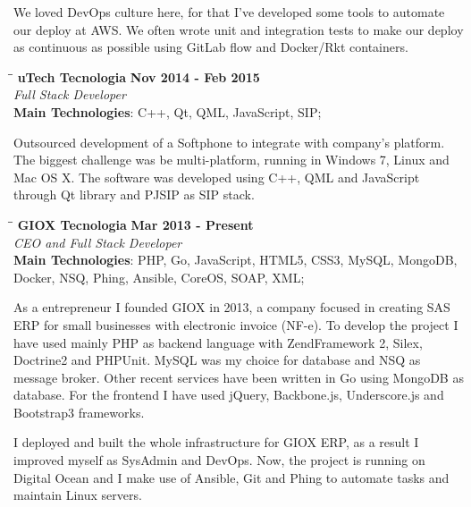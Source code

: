 \documentclass[margin]{res}
\begin{document}
\begin{resume}
We loved DevOps culture here, for that I've developed some tools to automate our deploy at AWS. We often wrote unit and integration tests to make our deploy as continuous as possible using GitLab flow and Docker/Rkt containers.

\newpage

\vspace{-0.1in}
    \begin{tabbing}
    \hspace{2.3in}\= \hspace{1.7in}\= \kill
    \textbf{uTech Tecnologia}    \>\>\textbf{Nov 2014 - Feb 2015}\\
    \textit{Full Stack Developer}\\
    \textbf{Main Technologies}: C++, Qt, QML, JavaScript, SIP;
    \end{tabbing}\vspace{-20pt}
    \vspace{2mm}
Outsourced development of a Softphone to integrate with company’s platform. The biggest challenge was be multi-platform, running in Windows 7, Linux and Mac OS X. The software was developed using C++, QML and JavaScript through Qt library and PJSIP as SIP stack.

\vspace{-0.1in}
    \begin{tabbing}
    \hspace{2.3in}\= \hspace{1.7in}\= \kill
    \textbf{GIOX Tecnologia}    \>\>\textbf{Mar 2013 - Present}\\
    \textit{CEO and Full Stack Developer}\\
    \textbf{Main Technologies}: PHP, Go, JavaScript, HTML5, CSS3, MySQL, MongoDB,\\Docker, NSQ, Phing, Ansible, CoreOS, SOAP, XML;
    \end{tabbing}\vspace{-20pt}
    \vspace{2mm}
As a entrepreneur I founded GIOX in 2013, a company focused in creating SAS ERP for small businesses with electronic invoice (NF-e). To develop the project I have used mainly PHP as backend language with ZendFramework 2, Silex, Doctrine2 and PHPUnit. MySQL was my choice for database and NSQ as message broker. Other recent services have been written in Go using MongoDB as database. For the frontend I have used jQuery, Backbone.js, Underscore.js and Bootstrap3 frameworks.

I deployed and built the whole infrastructure for GIOX ERP, as a result I improved myself as SysAdmin and DevOps. Now, the project is running on Digital Ocean and I make use of Ansible, Git and Phing to automate tasks and maintain Linux servers.


\end{resume}
\end{document}
